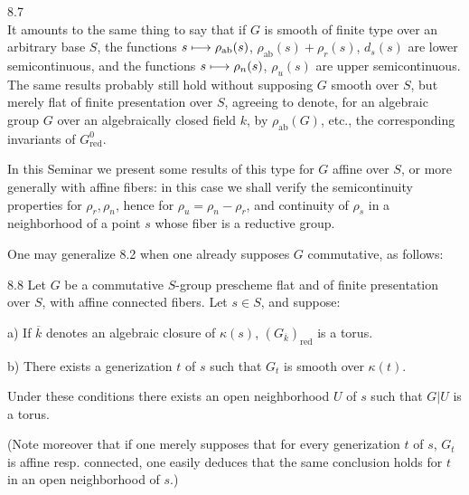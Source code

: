 \begin{remarks}{8.7}
\[\]
It amounts to the same thing to say that if $G$ is smooth of finite type over an arbitrary base $S$, the functions $s\longmapsto\rho_{\mathrm{ab}}(s)$, $\rho_{\mathrm{ab}}(s)+\rho_r(s)$, $d_s(s)$ are lower semicontinuous, and the functions $s\longmapsto\rho_n(s)$, $\rho_u(s)$ are upper semicontinuous.
The same results probably still hold without supposing $G$ smooth over $S$, but merely flat of finite presentation over $S$, agreeing to denote, for an algebraic group $G$ over an algebraically closed field $k$, by $\rho_{\mathrm{ab}}(G)$, etc., the corresponding invariants of $G^0_{\mathrm{red}}$.

In this Seminar we present some results of this type for $G$ affine over $S$, or more generally with affine fibers: in this case we shall verify the semicontinuity properties for $\rho_r,\rho_n$, hence for $\rho_u=\rho_n-\rho_r$, and continuity of $\rho_s$ in a neighborhood of a point $s$ whose fiber is a reductive group.\footnotemark[\value{footnote}]
\end{remarks}
One may generalize 8.2 when one already supposes $G$ commutative, as follows:
\begin{theorem}{8.8}\label{X.8.8}
 Let $G$ be a commutative $S$-group prescheme flat and of finite presentation over $S$, with affine connected fibers. Let $s\in S$, and suppose:

a) If $\overline k$ denotes an algebraic closure of $\kappa(s)$, $(G_{\overline k})_{\mathrm{red}}$ is a torus.

b) There exists a generization $t$ of $s$ such that $G_t$ is smooth over $\kappa(t)$.

Under these conditions there exists an open neighborhood $U$ of $s$ such that $G|U$ is a torus.
\end{theorem}
(Note moreover that if one merely supposes that for every generization $t$ of $s$, $G_t$ is affine resp. connected, one easily deduces that the same conclusion holds for $t$ in an open neighborhood of $s$.)
